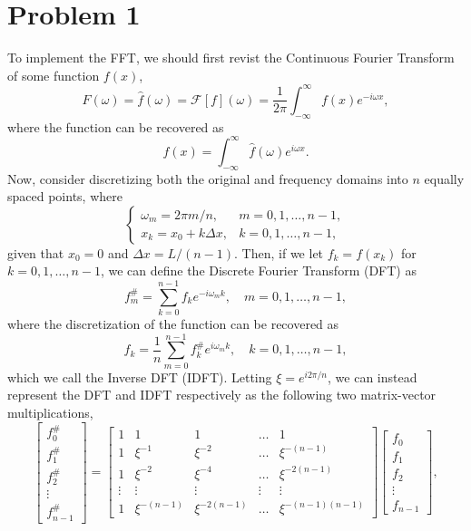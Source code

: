 \documentclass[11pt]{article}
\begin{document}
\section{Problem 1}
To implement the FFT, we should first revist the Continuous Fourier Transform of some function $f(x)$,
	\begin{equation*}
		F(\omega) = \hat{f}(\omega) = \mathcal{F}\left[f\right](\omega) = \frac{1}{2\pi}\int_{-\infty}^{\infty}{f(x)e^{-i\omega x}},
	\end{equation*}
where the function can be recovered as
	\begin{equation*}
		f(x) = \int_{-\infty}^{\infty}{\hat{f}(\omega)e^{i\omega x}}.
	\end{equation*}
Now, consider discretizing both the original and frequency domains into $n$ equally spaced points, where
	\begin{equation*}
		\begin{cases}
			\omega_m = 2\pi m/n, & m = 0,1,\dots,n-1, \\
			x_k = x_0 + k\Delta x, & k = 0,1,\dots,n-1,
		\end{cases}
	\end{equation*}
given that $x_0 = 0$ and $\Delta x = L/(n-1)$. Then, if we let $f_k = f(x_k)$ for $k = 0,1,\dots,n-1$,
we can define the Discrete Fourier Transform (DFT) as
	\begin{equation*}
		f_{m}^{\#} = \sum_{k=0}^{n-1}{f_ke^{-i\omega_mk}}, \quad m = 0,1,\dots,n-1,
	\end{equation*}
where the discretization of the function can be recovered as
	\begin{equation*}
		f_{k} = \frac{1}{n}\sum_{m=0}^{n-1}{f_{k}^{\#}e^{i\omega_mk}}, \quad k = 0,1,\dots,n-1,
	\end{equation*}
which we call the Inverse DFT (IDFT). Letting $\xi = e^{i 2\pi/n}$, we can instead represent the DFT and
IDFT respectively as the following two matrix-vector multiplications,
\begin{equation*}
	\begin{bmatrix}
		f_{0}^{\#} \\
		f_{1}^{\#} \\
		f_{2}^{\#} \\
		\vdots \\
		f_{n-1}^{\#}
	\end{bmatrix}
	=
	\begin{bmatrix}
		1 & 1 & 1 & \dots & 1 \\
		1 & \xi^{-1} & \xi^{-2} & \dots & \xi^{-(n-1)} \\
		1 & \xi^{-2} & \xi^{-4} & \dots & \xi^{-2(n-1)} \\
		\vdots & \vdots & \vdots & \vdots & \vdots \\
		1 & \xi^{-(n-1)} & \xi^{-2(n-1)} & \dots & \xi^{-(n-1)(n-1)} 
	\end{bmatrix}
	\begin{bmatrix}
		f_{0} \\
		f_{1} \\
		f_{2} \\
		\vdots \\
		f_{n-1}
	\end{bmatrix},
\end{equation*}
\end{document}
